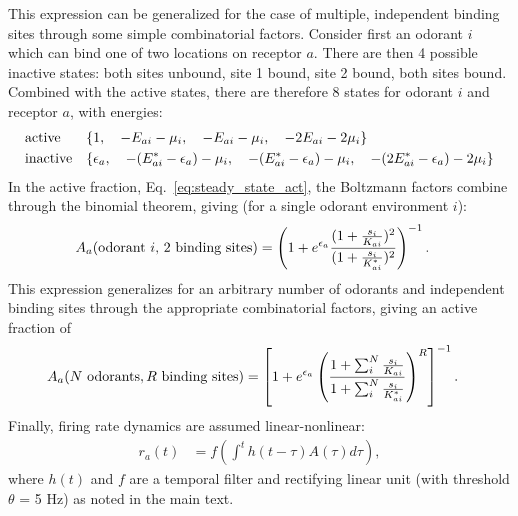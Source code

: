 \documentclass[9pt,twoside]{pnas-new}
\begin{document}
This expression can be generalized for the case of multiple, independent binding sites through some simple combinatorial factors. Consider first an odorant $i$ which can bind one of two locations on receptor $a$. There are then 4 possible inactive states: both sites unbound, site 1 bound, site 2 bound, both sites bound. Combined with the active states, there are therefore 8 states for odorant $i$ and receptor $a$, with energies: 
\begin{align}
& \textup{active}  && \{1, \quad -E_{ai} - \mu_i, \quad -E_{ai} - \mu_i, \quad -2E_{ai} - 2\mu_i\} \nonumber \\
& \textup{inactive}  && \{\epsilon_a, \quad -(E^*_{ai}  - \epsilon_a) - \mu_i, \quad -(E^*_{ai}  - \epsilon_a) - \mu_i, \quad -(2E^*_{ai}  - \epsilon_a) - 2\mu_i\} 
\end{align}
In the active fraction, Eq.~\ref{eq:steady_state_act}, the Boltzmann factors combine through the binomial theorem, giving (for a single odorant environment $i$):
\begin{align}
A_a(\textup {odorant }i \textup{, 2 binding sites}) &= 
    \left(1 + e^{\epsilon_a}\frac{(1 + \frac{s_i}{K_{ai}})^2}{(1 + \frac{s_i}{K^*_{ai}})^2}
    \right)^{-1}.
\end{align} 
This expression generalizes for an arbitrary number of odorants and independent binding sites through the appropriate combinatorial factors, giving an active fraction of
\begin{align}
A_a(N \textup { odorants}, R \textup { binding sites}) &= 
    \left[1 + e^{\epsilon_a}\left(\frac{1 + \sum_i^N\frac{s_i}{K_{ai}}}{1 + \sum_i^N \frac{s_i}{K^*_{ai}}}\right)^R\right]^{-1}. 
\end{align} 
Finally, firing rate dynamics are assumed linear-nonlinear:
\begin{align}
r_a(t) &= f\left(\int^t h(t - \tau) A(\tau) d\tau\right) \label{eq:firing_machinery},
\end{align}
where $h(t)$ and $f$ are a temporal filter and rectifying linear unit (with threshold $\theta$ = 5 Hz) as noted in the main text.








\iffalse
\end{document}
